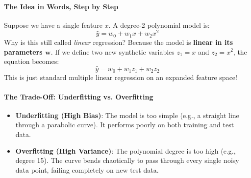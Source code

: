\paragraph{The Idea in Words, Step by Step}
Suppose we have a single feature $x$. A degree-2 polynomial model is:
\begin{equation}
\hat{y} = w_0 + w_1 x + w_2 x^2\label{eq:poly_degree2}
\end{equation}
Why is this still called \textit{linear} regression? Because the model is \textbf{linear in its parameters $\mathbf{w}$}. If we define two new synthetic variables $z_1 = x$ and $z_2 = x^2$, the equation becomes:
\begin{equation*}
\hat{y} = w_0 + w_1 z_1 + w_2 z_2
\end{equation*}
This is just standard multiple linear regression on an expanded feature space!

\paragraph{The Trade-Off: Underfitting vs. Overfitting}
\begin{itemize}
    \item \textbf{Underfitting (High Bias)}: The model is too simple (e.g., a straight line through a parabolic curve). It performs poorly on both training and test data.
    \item \textbf{Overfitting (High Variance)}: The polynomial degree is too high (e.g., degree 15). The curve bends chaotically to pass through every single noisy data point, failing completely on new test data.
\end{itemize}

